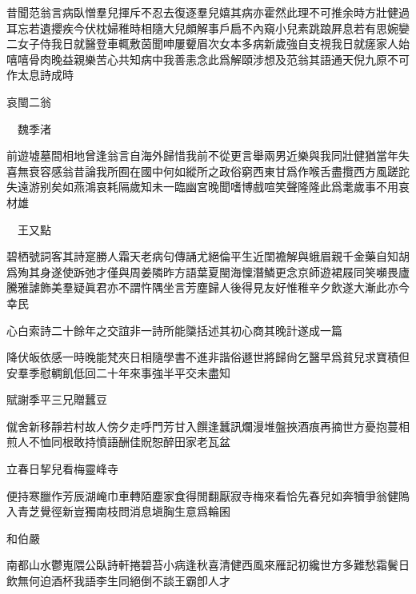 \documentclass{zhvt-classic-Miya}
\begin{document}
昔聞范翁言病臥憎羣兒揮斥不忍去復逐羣兒嬉其病亦霍然此理不可推余時方壯健過耳忘若遺攖疾今伏枕婦稚時相隨大兒頗解事戶扃不內窺小兒素跳踉屛息若有思婉孌二女子侍我日就醫登車輒敷茵聞呻屢顰眉次女本多病新歲強自支視我日就瘥家人始嘻嘻骨肉晚益親樂苦心共知病中我善恚念此爲解頤涉想及范翁其語通天倪九原不可作太息詩成時

\begin{fw}哀閩二翁\end{fw}

\begin{fw}　魏季渚\end{fw}

前遊墟墓間相地曾逢翁言自海外歸惜我前不從更言舉兩男近樂與我同壯健猶當年失喜無衰容感翁昔論我所囿在國中何如縱所之政俗窮西東甘爲作喉舌盡攬西方風蹉跎失遠游别矣如燕鴻哀耗隔歲知未一臨幽宮晚聞嗜博戲喧笑聲隆隆此爲耄歲事不用哀材雄

\begin{fw}　王又點\end{fw}

碧栖號詞客其詩寔勝人霜天老病句傳誦尤絕倫平生近閨襜解與蛾眉親千金藥自知胡爲殉其身遂使跅弛才僅與周姜隣昨方語葉夏閩海懍潛鱗更念京師遊裙屐同笑嚬畏廬騰雅謔飾美羣疑眞君亦不謂忤隅坐言芳塵歸人後得見友好惟稚辛夕飲遂大漸此亦今幸民

\begin{fw}心白索詩二十餘年之交誼非一詩所能櫽括述其初心商其晚計遂成一篇\end{fw}

降伏皈依感一時晚能梵夾日相隨學書不進非諧俗遯世將歸尙乞醫早爲貧兒求寶積但安羣季慰輖飢低回二十年來事強半平交未盡知

\begin{fw}賦謝季平三兄贈蠶豆\end{fw}

僦舍新移靜若村故人傍夕走呼門芳甘入饌逢蠶訊爛漫堆盤挾酒痕再摘世方憂抱蔓相煎人不恤同根敢持憤語酬佳貺恕醉田家老瓦盆

\begin{fw}立春日挈兒看梅靈峰寺\end{fw}

便持寒臘作芳辰湖崦巾車轉陌塵家食得閒翻厭寂寺梅來看恰先春兒如奔犢爭翁健隖入青芝覺徑新豈獨南枝問消息塡胸生意爲輪囷

\begin{fw}和伯嚴\end{fw}

南都山水鬱嵬隈公臥詩軒捲碧苔小病逢秋喜清健西風來雁記初纔世方多難愁霜鬢日飲無何迫酒杯我語李生同絕倒不談王霸卽人才
\end{document}
